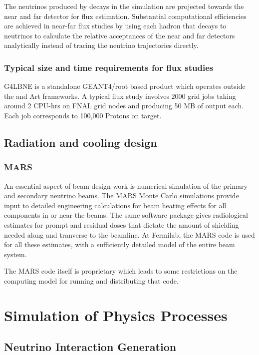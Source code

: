 The neutrinos produced by decays in the simulation are projected towards
the near and far detector for flux estimation. Substantial computational efficiencies are achieved in near-far flux studies by using each hadron that decays to neutrinos to calculate the relative acceptances of the near and far detectors analytically instead of tracing the neutrino trajectories directly\cite{Szleper:2001nj}.


\subsubsection{Typical size and time requirements for flux studies}
G4LBNE is a standalone GEANT4/root based product which operates outside the   and Art frameworks. 
A typical flux study involves 
2000 grid jobs taking around 2 CPU-hrs on FNAL grid nodes and producing 50 MB of output each.  Each job corresponds to 100,000 Protons on target.    


\subsection{Radiation and cooling design}
\subsubsection{MARS} %

An essential aspect of beam design work is numerical simulation of the primary and secondary neutrino beams. The MARS Monte Carlo  simulations provide input to detailed engineering calculations for beam heating effects for all components in or near the beams. The same software package gives radiological estimates for prompt and residual doses that dictate the amount of shielding needed along and tranverse to the beamline. At Fermilab, the MARS code \cite{abs_1} is used for all these estimates, with a sufficiently detailed model of the entire beam system.  

The MARS code itself is proprietary %
which leads to some restrictions on the computing model for running and distributing that code. 

\section{Simulation of Physics Processes}
\subsection{Neutrino Interaction Generation}
